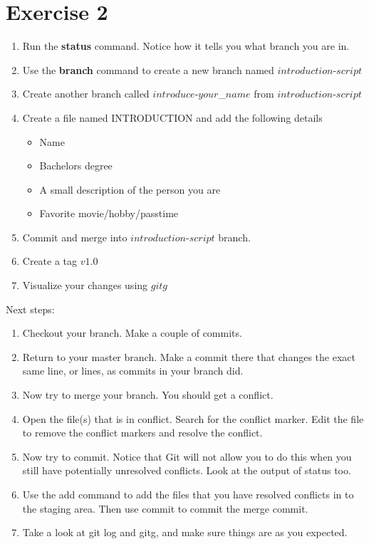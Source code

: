 \documentclass{article}
\begin{document}
	\section{Exercise 2}
	\begin{enumerate}
		\item Run the \textbf{status} command. Notice how it tells you what branch you are in.
		\item Use the \textbf{branch} command to create a new branch named $introduction$-$script$
		\item Create another branch called $introduce$-$your$\_$name$ from $introduction$-$script$
		\item Create a file named INTRODUCTION and add the following details
		\begin{itemize}
			\item Name
			\item Bachelors degree
			\item A small description of the person you are
			\item Favorite movie/hobby/passtime
		\end{itemize}
		\item Commit and merge into $introduction$-$script$ branch.
		\item Create a tag $v1.0$
		\item Visualize your changes using $gitg$
	\end{enumerate}
Next steps:
\begin{enumerate}
\item Checkout your branch. Make a couple of commits.
\item Return to your master branch. Make a commit there that changes the exact same line, or
lines, as commits in your branch did.
\item Now try to merge your branch. You should get a conflict.
\item Open the file(s) that is in conflict. Search for the conflict marker. Edit the file to remove the
conflict markers and resolve the conflict.
\item Now try to commit. Notice that Git will not allow you to do this when you still have
potentially unresolved conflicts. Look at the output of status too.
\item Use the add command to add the files that you have resolved conflicts in to the staging
area. Then use commit to commit the merge commit.
\item Take a look at git log and gitg, and make sure things are as you expected.
\end{enumerate}
	
\end{document}
